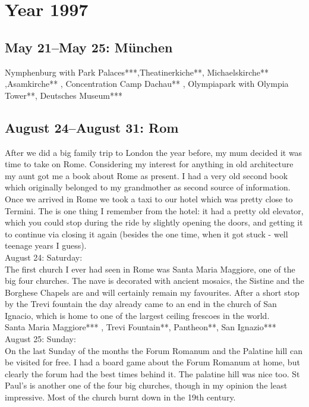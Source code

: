\chapter{Year 1997}
\label{1997}

\section{May 21--May 25: M\"unchen}
\label{1997:Muenchen}


Nymphenburg with Park Palaces***,Theatinerkiche**, Michaelskirche** ,Asamkirche** , Concentration Camp Dachau** , Olympiapark with Olympia Tower**, Deutsches Museum***

\section{August 24--August 31: Rom}
\label{1997:Rom}

After we did a big family trip to London the year before, my mum decided it was time to take on Rome. Considering my interest for anything in old architecture my aunt got me a book about Rome as present. I had a very old second book which originally belonged to my grandmother as second source of information. Once we arrived in Rome we took a taxi to our hotel which was pretty close to Termini. The is one thing I remember from the hotel: it had a pretty old elevator, which you could stop during the ride by slightly opening the doors, and getting it to continue via closing it again (besides the one time, when it got stuck - well teenage years I guess). \\

August 24: Saturday:\\
The first church I ever had seen in Rome was Santa Maria Maggiore, one of the big four churches. The nave is decorated with ancient mosaics, the Sistine and the Borghese Chapels are and will certainly remain my favourites. After a short stop by the Trevi fountain the day already came to an end in the church of San Ignacio, which is home to one of the largest ceiling frescoes in the world.\\

Santa Maria Maggiore*** , Trevi Fountain**, Pantheon**, San Ignazio***\\

August 25: Sunday:\\
On the last Sunday of the months the Forum Romanum and the Palatine hill can be visited for free. I had a board game about the Forum Romanum at home, but clearly the forum had the best times behind it. The palatine hill was nice too. St Paul's is another one of the four big churches, though in my opinion the least impressive. Most of the church burnt down in the 19th century.\\

